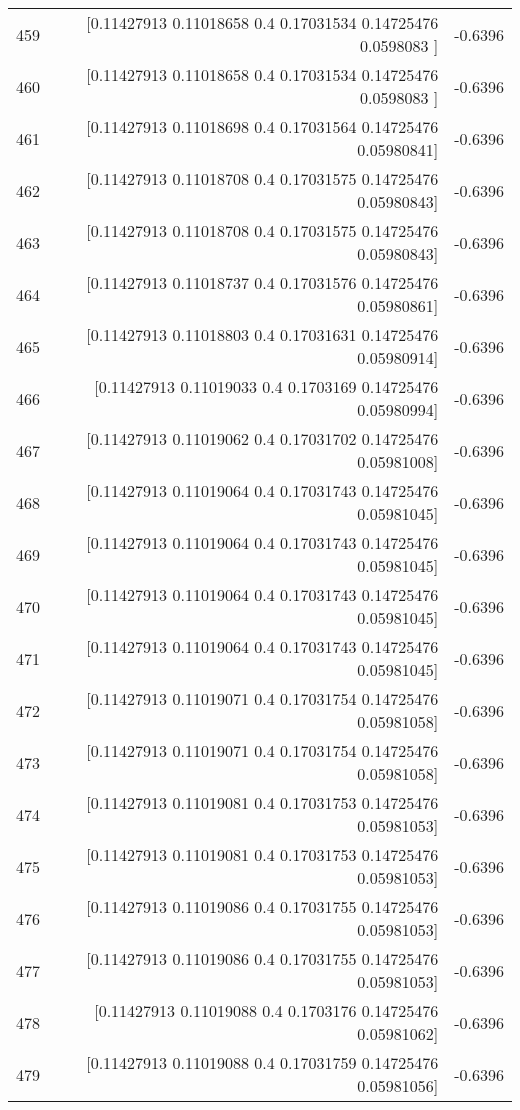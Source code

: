 \begin{longtable}{lrr}
459 & [0.11427913 0.11018658 0.4        0.17031534 0.14725476 0.0598083 ] & -0.6396 \\
460 & [0.11427913 0.11018658 0.4        0.17031534 0.14725476 0.0598083 ] & -0.6396 \\
461 & [0.11427913 0.11018698 0.4        0.17031564 0.14725476 0.05980841] & -0.6396 \\
462 & [0.11427913 0.11018708 0.4        0.17031575 0.14725476 0.05980843] & -0.6396 \\
463 & [0.11427913 0.11018708 0.4        0.17031575 0.14725476 0.05980843] & -0.6396 \\
464 & [0.11427913 0.11018737 0.4        0.17031576 0.14725476 0.05980861] & -0.6396 \\
465 & [0.11427913 0.11018803 0.4        0.17031631 0.14725476 0.05980914] & -0.6396 \\
466 & [0.11427913 0.11019033 0.4        0.1703169  0.14725476 0.05980994] & -0.6396 \\
467 & [0.11427913 0.11019062 0.4        0.17031702 0.14725476 0.05981008] & -0.6396 \\
468 & [0.11427913 0.11019064 0.4        0.17031743 0.14725476 0.05981045] & -0.6396 \\
469 & [0.11427913 0.11019064 0.4        0.17031743 0.14725476 0.05981045] & -0.6396 \\
470 & [0.11427913 0.11019064 0.4        0.17031743 0.14725476 0.05981045] & -0.6396 \\
471 & [0.11427913 0.11019064 0.4        0.17031743 0.14725476 0.05981045] & -0.6396 \\
472 & [0.11427913 0.11019071 0.4        0.17031754 0.14725476 0.05981058] & -0.6396 \\
473 & [0.11427913 0.11019071 0.4        0.17031754 0.14725476 0.05981058] & -0.6396 \\
474 & [0.11427913 0.11019081 0.4        0.17031753 0.14725476 0.05981053] & -0.6396 \\
475 & [0.11427913 0.11019081 0.4        0.17031753 0.14725476 0.05981053] & -0.6396 \\
476 & [0.11427913 0.11019086 0.4        0.17031755 0.14725476 0.05981053] & -0.6396 \\
477 & [0.11427913 0.11019086 0.4        0.17031755 0.14725476 0.05981053] & -0.6396 \\
478 & [0.11427913 0.11019088 0.4        0.1703176  0.14725476 0.05981062] & -0.6396 \\
479 & [0.11427913 0.11019088 0.4        0.17031759 0.14725476 0.05981056] & -0.6396 \\

\end{longtable}
